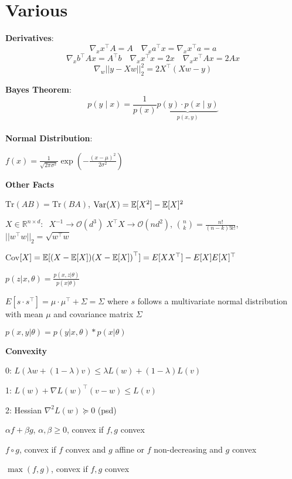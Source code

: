 \section*{Various}

\textbf{Derivatives}:
$$\nabla_x x^\top A = A \quad \nabla_x a^\top x = \nabla_x x^\top a = a$$
$$\nabla_x b^\top A x = A^\top b \quad \nabla_x x^\top x = 2x \quad \nabla_x x^\top A x = 2 Ax$$
$$\nabla_w || y-Xw||_2^2 = 2X^\top(Xw-y)$$

\textbf{Bayes Theorem}: \\[-13pt]
$$p(y \; | \; x) = \frac{1}{p(x)} \underbrace{p(y) \cdot p(x \; | \; y)}_{p(x,y)}$$ \\[-23pt]

\textbf{Normal Distribution}:

$f(x) = \frac{1}{\sqrt{2\pi \sigma^2}} \exp\left(-\frac{(x - \mu)^2}{2\sigma^2}\right)$

\textbf{Other Facts}

$\text{Tr}(AB) = \text{Tr}(BA)$, $\text{Var}(X) = \mathbb{E}[X^2] - \mathbb{E}[X]^2$

$X \in \mathbb{R}^{n \times d}: \; \; X^{-1} \rightarrow \mathcal{O}(d^3) \; X^\top X \rightarrow \mathcal{O}(nd^2)$, $\binom{n}{k} = \frac{n!}{(n-k)!k!}$, $||w^\top w||_2 = \sqrt{w^\top w}$
 
Cov$[X] = \mathbb{E}[(X- \mathbb{E}[X]){(X- \mathbb{E}[X])}^\top] = E[XX^{\top}] - E[X]E[X]^{\top}$

$p(z|x,\theta) = \frac{p(x,z|\theta)}{p(x | \theta)}$

$E[s \cdot {s}^\top] = \mu \cdot \mu^\top + \Sigma = \Sigma$ where $s$ follows a multivariate normal distribution with mean $\mu$ and covariance matrix $\Sigma$

$p(x, y | \theta) = p(y | x, \theta) * p(x | \theta)$

\textbf{Convexity}

0: $L(\lambda w + (1 - \lambda)v) \leq \lambda L (w) + (1- \lambda) L(v)$

1: $L(w) + \nabla L(w)^\top (v - w) \leq L(v)$

2: Hessian $\nabla^2 L (w) \succcurlyeq 0$ (psd)

\begin{compactitem}
	\item $\alpha f + \beta g$, $\alpha, \beta \geq 0$, convex if $f, g$ convex
	\item $f \circ g$, convex if $f$ convex and $g$ affine or $f$ non-decreasing and $g$ convex
	\item $\max(f, g)$, convex if $f,g$ convex
\end{compactitem}


